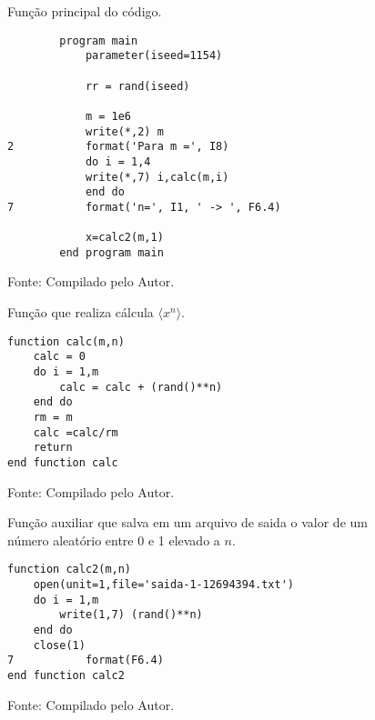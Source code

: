 \vspace*{1\baselineskip}

\begin{figure}[h!]
\centering
\caption{Função principal do código.}
\centering

\begin{lstlisting}
        program main
            parameter(iseed=1154)
            
            rr = rand(iseed)

            m = 1e6
            write(*,2) m
2           format('Para m =', I8)
            do i = 1,4
            write(*,7) i,calc(m,i)
            end do
7           format('n=', I1, ' -> ', F6.4)

            x=calc2(m,1)
        end program main

\end{lstlisting}

\caption*{Fonte: Compilado pelo Autor.}
\label{fig:tarefa 1 - função principal do código}
\end{figure}

\vspace*{2\baselineskip}

\begin{figure}[h!]
\centering
\caption{Função que realiza cálcula $\langle x^n \rangle$.}
\centering

\begin{lstlisting}
function calc(m,n)
    calc = 0
    do i = 1,m
        calc = calc + (rand()**n)
    end do
    rm = m
    calc =calc/rm
    return
end function calc
\end{lstlisting}
\caption*{Fonte: Compilado pelo Autor.}
\label{fig:tarefa 1 - função que da às medias dos valores pseudo aleatórios}
\end{figure}

\vspace*{2\baselineskip}


\begin{figure}[h!]
\centering
\caption{Função auxiliar que salva em um arquivo de saida o valor de um número aleatório entre 0 e 1 elevado a $n$.}
\centering

\begin{lstlisting}
function calc2(m,n)
    open(unit=1,file='saida-1-12694394.txt')
    do i = 1,m
        write(1,7) (rand()**n)
    end do
    close(1)
7           format(F6.4)
end function calc2
\end{lstlisting}

\caption*{Fonte: Compilado pelo Autor.}
\label{fig:tarefa 1 - função auxiliar}
\end{figure}

